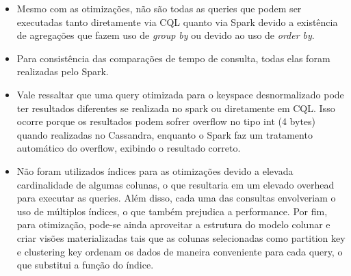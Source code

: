 \documentclass[12pt]{article}
\begin{document}
\begin{itemize}
    \item Mesmo com as otimizações, não são todas as queries que podem ser executadas tanto diretamente via CQL quanto via Spark devido a existência de agregações que fazem uso de \emph{group by} ou devido ao uso de \emph{order by}.
    \item Para consistência das comparações de tempo de consulta, todas elas foram realizadas pelo Spark.
    \item Vale ressaltar que uma query otimizada para o keyspace desnormalizado pode ter resultados diferentes se realizada no spark ou diretamente em CQL. Isso ocorre porque os resultados podem sofrer overflow no tipo int (4 bytes) quando realizadas no Cassandra, enquanto o Spark faz um tratamento automático do overflow, exibindo o resultado correto.
    \item Não foram utilizados índices para as otimizações devido a elevada cardinalidade de algumas colunas, o que resultaria em um elevado overhead para executar as queries. Além disso, cada uma das consultas envolveriam o uso de múltiplos índices, o que também prejudica a performance. Por fim, para otimização, pode-se ainda aproveitar a estrutura do modelo colunar e criar visões materializadas tais que as colunas selecionadas como partition key e clustering key ordenam os dados de maneira conveniente para cada query, o que substitui a função do índice.
\end{itemize}
\end{document}
